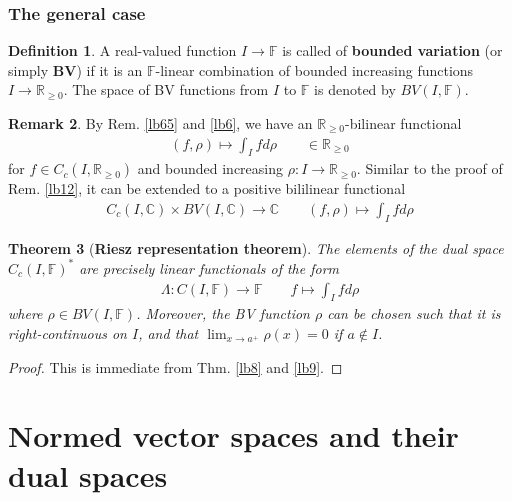 \documentclass[12pt,b5paper,notitlepage]{article}
\theoremstyle{definition}
\newtheorem{df}{Definition}[subsection]
\newtheorem{rem}[df]{Remark}
\theoremstyle{plain}
\newtheorem{thm}[df]{Theorem}
\newcommand{\Cbb}{\mathbb C}
\newcommand{\Rbb}{\mathbb R}
\newcommand{\Fbb}{\mathbb F}
\numberwithin{equation}{section}
\begin{document}
\subsubsection{The general case}


\begin{df}
 A real-valued function $I\rightarrow\Fbb$ is called of \textbf{bounded variation} (or simply \textbf{BV})  if it is an $\Fbb$-linear combination of bounded increasing functions $I\rightarrow\Rbb_{\geq0}$. The space of BV functions from $I$ to $\Fbb$ is denoted by $BV(I,\Fbb)$. \index{BV@$BV(I,\Fbb)$}
\end{df}

\begin{rem}
By Rem. \ref{lb65} and \ref{lb6}, we have an $\Rbb_{\geq0}$-bilinear functional
\begin{align*}
(f,\rho)\mapsto \int_I fd\rho\qquad\in\Rbb_{\geq0}
\end{align*}
for $f\in C_c(I,\Rbb_{\geq0})$ and bounded increasing $\rho:I\rightarrow\Rbb_{\geq0}$. Similar to the proof of Rem. \ref{lb12}, it can be extended to a positive bililinear functional 
\begin{align*}
C_c(I,\Cbb)\times BV(I,\Cbb)\rightarrow\Cbb\qquad (f,\rho)\mapsto \int_I fd\rho
\end{align*}
\end{rem}


\begin{thm}[\textbf{Riesz representation theorem}]\label{lb10}
The elements of the dual space $C_c(I,\Fbb)^*$ are precisely linear functionals of the form
\begin{gather*}
\Lambda:C(I,\Fbb)\rightarrow\Fbb\qquad f\mapsto\int_I fd\rho
\end{gather*}
where $\rho\in BV(I,\Fbb)$. Moreover, the BV function $\rho$ can be chosen such that it is right-continuous on $I$, and that $\lim_{x\rightarrow a^+}\rho(x)=0$ if $a\notin I$.
\end{thm}

\begin{proof}
This is immediate from Thm. \ref{lb8} and \ref{lb9}.
\end{proof}







\newpage


\section{Normed vector spaces and their dual spaces}
\end{document}
